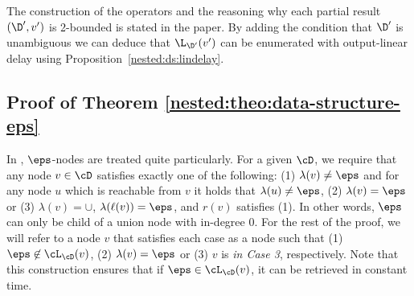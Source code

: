 %
%
%
%

The construction of the operators and the reasoning why each partial result $(\D',v')$ is 2-bounded is stated in the paper. 
By adding the condition that $\D'$ is unambiguous we can deduce that $\L_{\D'}(v')$ can be enumerated with output-linear delay using Proposition~\ref{nested:ds:lindelay}.


\subsection{Proof of Theorem \ref{nested:theo:data-structure-eps}}

In \dsepsabbr, $\eps$-nodes are treated quite particularly. 
For a given \dsepsabbr $\cD$, we require that any node $v\in\cD$ satisfies exactly one of the following:
(1) $\lambda(v) \neq \eps$ and for any node $u$ which is reachable from $v$ it holds that $\lambda(u) \neq \eps$, (2) $\lambda(v) = \eps$ or (3) $\lambda(v) = \cup$, $\lambda(\ell(v)) = \eps$, and $r(v)$ satisfies (1). 
In other words, $\eps$ can only be child of a union node with in-degree 0.
For the rest of the proof, we will refer to a node $v$ that satisfies each case as a node such that (1) $\eps\not\in\cL_{\cD}(v)$, (2) $\lambda(v) = \eps$ or (3) $v$ is {\em in Case 3}, respectively.
Note that this construction ensures that if $\eps\in\cL_{\cD}(v)$, it can be retrieved in constant time.

